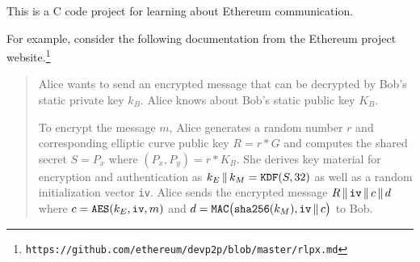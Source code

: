 \documentclass[12pt]{article}
\begin{document}
This is a C code project for learning about Ethereum communication.

\bigskip
For example, consider the following documentation
from the Ethereum project website.\footnote{\tt https://github.com/ethereum/devp2p/blob/master/rlpx.md}

\begin{quote}
Alice wants to send an encrypted message that can be decrypted by Bob's static private key $k_B$.
Alice knows about Bob's static public key $K_B$.

\medskip
To encrypt the message $m$, Alice generates a random number $r$
and corresponding elliptic curve public key $R=r*G$ and computes the
shared secret $S=P_x$ where $(P_x,P_y)=r*K_B$.
She derives key material for encryption and authentication as
$k_E\,\|\,k_M=\text{\tt KDF}(S,32)$
as well as a random initialization vector \verb$iv$.
Alice sends the encrypted message $R\,\|\,\text{\tt iv}\,\|\,c\,\|\,d$
where $c=\text{\tt AES}(k_E,\text{\tt iv},m)$
and $d=\text{\tt MAC}\big(\text{\tt sha256}(k_M),\text{\tt iv}\,\|\,c\big)$ to Bob.
\end{quote}
\end{document}
